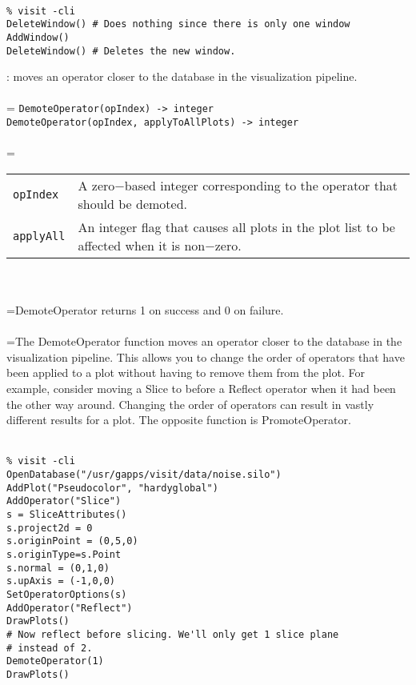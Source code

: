 \documentclass[10pt,a4paper]{report}
\begin{document}
\\[-6mm]
\begin{verbatim}% visit -cli
DeleteWindow() # Does nothing since there is only one window
AddWindow()
DeleteWindow() # Deletes the new window.
\end{verbatim}
\newpage


{}
: moves an operator closer to the database in the visualization pipeline.\\[-3mm]

 \\ 
\hangindent=\parindent 
\verb!DemoteOperator(opIndex) -> integer!\\ 
\verb!DemoteOperator(opIndex, applyToAllPlots) -> integer!\\ [-3mm]

 \\ 
\hangindent=\parindent 
\begin{tabular}{lp{9cm}}
\verb!opIndex! & A zero$-$based integer corresponding to the operator that should be demoted. \\
\verb!applyAll! & An integer flag that causes all plots in the plot list to be affected when it is non$-$zero. \\
\end{tabular} \\[-2mm]


 \\ 
\hangindent=\parindent DemoteOperator returns 1 on success and 0 on failure. \\[-3mm] 

 \\ 
\hangindent=\parindent The DemoteOperator function moves an operator closer to the database in the visualization pipeline. This allows you to change the order of operators that have been applied to a plot without having to remove them from the plot. For example, consider moving a Slice to before a Reflect operator when it had been the other way around. Changing the order of operators can result in vastly different results for a plot. The opposite function is PromoteOperator. \\[-3mm] 

\\[-6mm]
\begin{verbatim}% visit -cli
OpenDatabase("/usr/gapps/visit/data/noise.silo")
AddPlot("Pseudocolor", "hardyglobal")
AddOperator("Slice")
s = SliceAttributes()
s.project2d = 0
s.originPoint = (0,5,0)
s.originType=s.Point
s.normal = (0,1,0)
s.upAxis = (-1,0,0)
SetOperatorOptions(s)
AddOperator("Reflect")
DrawPlots()
# Now reflect before slicing. We'll only get 1 slice plane
# instead of 2.
DemoteOperator(1)
DrawPlots()
\end{verbatim}
\newpage
\end{document}
